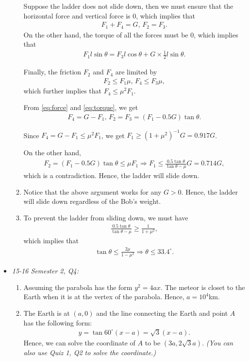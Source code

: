 \documentclass{article}
\begin{document}
\begin{itemize}
\begin{enumerate}[label=(\alph*)]
Suppose the ladder does not slide down, then we must ensure that the horizontal force and vertical force is 0, which implies that 
\begin{align}
  F_1 + F_4 = G,\, F_2 = F_3. 
  \label{eq:force}
\end{align}
On the other hand, the torque of all the forces must be $0$, which implies that
\begin{align}
  F_1 l\sin \theta=F_3 l \cos\theta + G \times \frac{1}{2}l \sin \theta.
  \label{eq:torque}
\end{align}

Finally, the friction $F_2$ and $F_4$ are limited by
\begin{align*}
  F_2 \leq F_1 \mu,\,F_4\leq F_3\mu,
\end{align*}
which further implies that $F_4\leq \mu^2 F_1$.

From \eqref{eq:force} and \eqref{eq:torque}, we get
\begin{align*}
  F_4 = G - F_1,\, F_2 = F_3 = (F_1-0.5G)\tan \theta.
\end{align*}

Since $F_4 = G-F_1 \leq \mu^2F_1$, we get $F_1 \geq (1+\mu^2)^{-1}G = 0.917G$.

On the other hand,
\begin{align*}
 F_2 =(F_1-0.5G) \tan\theta \leq \mu F_1\Rightarrow F_1 \leq\frac{0.5\tan\theta} {\tan\theta-\mu}G = 0.714G,
\end{align*}
which is a contradiction. Hence, the ladder will slide down.
\item Notice that the above argument works for any $G > 0$. Hence, the ladder will slide down regardless of the Bob's weight.
  \item To prevent the ladder from sliding down, we must have
\begin{align*}
  \frac{0.5\tan\theta} {\tan\theta-\mu} \geq \frac{1}{1+\mu^2},
\end{align*}
which implies that 
\begin{align*}
  \tan \theta \leq \frac{2\mu}{1-\mu^2}\Rightarrow \theta \leq 33.4^\circ. 
\end{align*}

    \end{enumerate}
\item \emph{15-16 Semester 2, Q4:}
  \begin{enumerate}[label=(\alph*)]
    \item Assuming the parabola has the form $y^2 = 4ax$. The meteor is closet to the Earth when it is at the vertex of the parabola. Hence, $a = 10^4$km.
      \item The Earth is at $(a,0)$ and the line connecting the Earth and point $A$ has the following form:
        \begin{align*}
          y = \tan 60^\circ (x -a) = \sqrt{3}(x-a).
        \end{align*}
        Hence, we can solve the coordinate of $A$ to be $(3a,2\sqrt{3}a)$. \emph{(You can also use Quiz 1, Q2 to solve the coordinate.)}


\end{enumerate}
\end{itemize}
\end{document}

